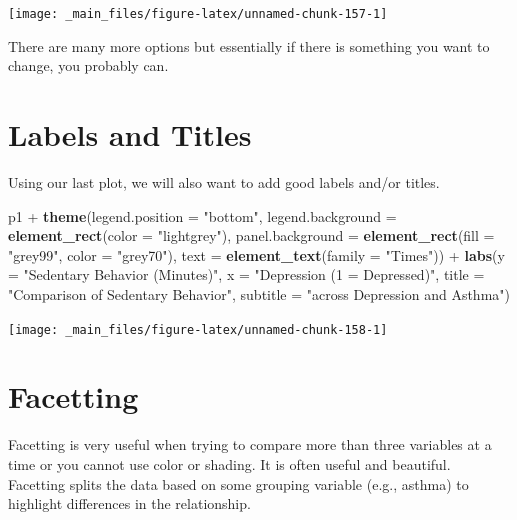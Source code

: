 \documentclass[]{tufte-book}
\newenvironment{Shaded}{}{}
\newcommand{\KeywordTok}[1]{\textcolor[rgb]{0.00,0.44,0.13}{\textbf{#1}}}
\newcommand{\DataTypeTok}[1]{\textcolor[rgb]{0.56,0.13,0.00}{#1}}
\newcommand{\StringTok}[1]{\textcolor[rgb]{0.25,0.44,0.63}{#1}}
\newcommand{\OperatorTok}[1]{\textcolor[rgb]{0.40,0.40,0.40}{#1}}
\newcommand{\NormalTok}[1]{#1}
\theoremstyle{definition}
\theoremstyle{definition}
\theoremstyle{remark}
\begin{document}
\texttt{[image: \_main\_files/figure-latex/unnamed-chunk-157-1]}

There are many more options but essentially if there is something you
want to change, you probably can.

\section*{Labels and Titles}\label{labels-and-titles}

Using our last plot, we will also want to add good labels and/or titles.

\begin{Shaded}
\begin{Highlighting}[]
\NormalTok{p1 }\OperatorTok{+}\StringTok{ }\KeywordTok{theme}\NormalTok{(}\DataTypeTok{legend.position =} \StringTok{"bottom"}\NormalTok{, }\DataTypeTok{legend.background =} \KeywordTok{element_rect}\NormalTok{(}\DataTypeTok{color =} \StringTok{"lightgrey"}\NormalTok{), }
    \DataTypeTok{panel.background =} \KeywordTok{element_rect}\NormalTok{(}\DataTypeTok{fill =} \StringTok{"grey99"}\NormalTok{, }
        \DataTypeTok{color =} \StringTok{"grey70"}\NormalTok{), }\DataTypeTok{text =} \KeywordTok{element_text}\NormalTok{(}\DataTypeTok{family =} \StringTok{"Times"}\NormalTok{)) }\OperatorTok{+}\StringTok{ }
\StringTok{    }\KeywordTok{labs}\NormalTok{(}\DataTypeTok{y =} \StringTok{"Sedentary Behavior (Minutes)"}\NormalTok{, }\DataTypeTok{x =} \StringTok{"Depression (1 = Depressed)"}\NormalTok{, }
        \DataTypeTok{title =} \StringTok{"Comparison of Sedentary Behavior"}\NormalTok{, }
        \DataTypeTok{subtitle =} \StringTok{"across Depression and Asthma"}\NormalTok{)}
\end{Highlighting}
\end{Shaded}

\texttt{[image: \_main\_files/figure-latex/unnamed-chunk-158-1]}

\section*{Facetting}\label{facetting}

Facetting is very useful when trying to compare more than three
variables at a time or you cannot use color or shading. It is often
useful and beautiful. Facetting splits the data based on some grouping
variable (e.g., asthma) to highlight differences in the relationship.
\end{document}
